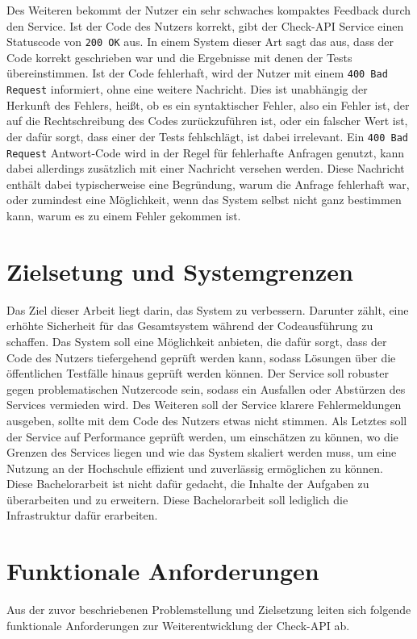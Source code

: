 Des Weiteren bekommt der Nutzer ein sehr schwaches kompaktes Feedback durch den Service. Ist der Code des Nutzers korrekt, gibt der Check-API Service einen Statuscode von \texttt{200 OK} aus. In einem System dieser Art sagt das aus, dass der Code korrekt geschrieben war und die Ergebnisse mit denen der Tests übereinstimmen. Ist der Code fehlerhaft, wird der Nutzer mit einem \texttt{400 Bad Request} informiert, ohne eine weitere Nachricht. Dies ist unabhängig der Herkunft des Fehlers, heißt, ob es ein syntaktischer Fehler, also ein Fehler ist, der auf die Rechtschreibung des Codes zurückzuführen ist, oder ein falscher Wert ist, der dafür sorgt, dass einer der Tests fehlschlägt, ist dabei irrelevant. Ein \texttt{400 Bad Request} Antwort-Code wird in der Regel für fehlerhafte Anfragen genutzt, kann dabei allerdings zusätzlich mit einer Nachricht versehen werden. Diese Nachricht enthält dabei typischerweise eine Begründung, warum die Anfrage fehlerhaft war, oder zumindest eine Möglichkeit, wenn das System selbst nicht ganz bestimmen kann, warum es zu einem Fehler gekommen ist.


\section{Zielsetung und Systemgrenzen}
Das Ziel dieser Arbeit liegt darin, das System zu verbessern. Darunter zählt, eine erhöhte Sicherheit für das Gesamtsystem während der Codeausführung zu schaffen. Das System soll eine Möglichkeit anbieten, die dafür sorgt, dass der Code des Nutzers tiefergehend geprüft werden kann, sodass Lösungen über die öffentlichen Testfälle hinaus geprüft werden können. Der Service soll robuster gegen problematischen Nutzercode sein, sodass ein Ausfallen oder Abstürzen des Services vermieden wird. Des Weiteren soll der Service klarere Fehlermeldungen ausgeben, sollte mit dem Code des Nutzers etwas nicht stimmen. Als Letztes soll der Service auf Performance geprüft werden, um einschätzen zu können, wo die Grenzen des Services liegen und wie das System skaliert werden muss, um eine Nutzung an der Hochschule effizient und zuverlässig ermöglichen zu können. Diese Bachelorarbeit ist nicht dafür gedacht, die Inhalte der Aufgaben zu überarbeiten und zu erweitern. Diese Bachelorarbeit soll lediglich die Infrastruktur dafür erarbeiten.


\section{Funktionale Anforderungen}
Aus der zuvor beschriebenen Problemstellung und Zielsetzung leiten sich folgende funktionale Anforderungen zur Weiterentwicklung der Check-API ab.

